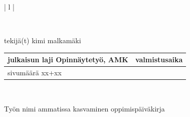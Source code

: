 \documentclass[11pt,a4paper,titlepage,oneside]{article}
\begin{document}
\begin{tabular}{ | l | }

    \\

    \hline
    \begin{minipage}[b]{6cm}
        tekijä(t)
        \newline
        kimi malkamäki 
    \end{minipage}%
    \begin{minipage}{8.5cm}
        \begin{tabular}{ | l | c | }
            \begin{minipage}[t][1cm][t]{4.25cm}
                julkaisun laji
                \newline
                Opinnäytetyö, AMK
            \end{minipage} & %
            \begin{minipage}{3.62cm}
                valmistusaika
                \newline
                2024
            \end{minipage} \\ \hline%
            \begin{minipage}[t][1cm][t]{4.25cm}
                sivumäärä
                \newline 
                xx+xx
            \end{minipage}
            &  \\ \hline
        \end{tabular}
    \end{minipage}%
      \\ \hline

    \begin{minipage}[t][2cm][t]{8cm}
    Työn nimi 
        \newline 
    ammatissa kasvaminen 
        \newline 
    oppimispäiväkirja  
    \end{minipage}\\ \hline


\end{tabular}
\end{document}
